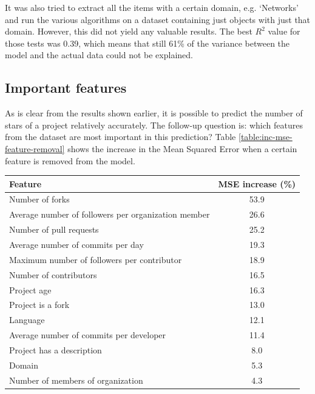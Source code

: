         It was also tried to extract all the items with a certain domain, e.g. `Networks' and run the various algorithms on a dataset containing just objects with just that domain. However, this did not yield any valuable results. 
        The best $R^2$ value for those tests was 0.39, which means that still 61\% of the variance between the model and the actual data could not be explained.
        
    \subsection{Important features}
        As is clear from the results shown earlier, it is possible to predict the number of stars of a project relatively accurately. 
        The follow-up question is: which features from the dataset are most important in this prediction? 
        Table \ref{table:inc-mse-feature-removal} shows the increase in the Mean Squared Error when a certain feature is removed from the model.
        \begin{center}
        \begin{tabular}[width=250pt]{|p{5cm}|c|}
            \hline
            Feature                                                       & MSE increase (\%) \\
            \hline
                Number of forks                                            & 53.9     \\
                Average number of followers per organization member        & 26.6    \\
                Number of pull requests                                    & 25.2     \\
                Average number of commits per day                          & 19.3     \\
                Maximum number of followers per contributor                & 18.9                   \\                    
                Number of contributors                                     & 16.5      \\
                Project age                                                & 16.3  \\
                Project is a fork                                          & 13.0      \\
                Language                                                   & 12.1      \\
                Average number of commits per developer                    & 11.4         \\
                Project has a description                                  & 8.0 \\
                Domain                                                     & 5.3 \\
                Number of members of organization                          & 4.3 \\
            \hline
        \end{tabular}
        \label{table:inc-mse-feature-removal}
     \end{center}
     
